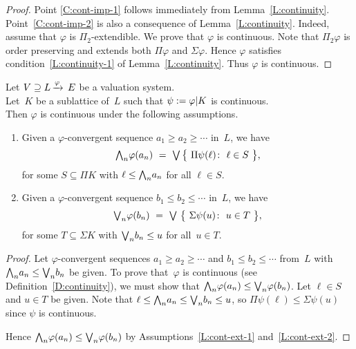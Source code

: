 \begin{proof}
Point \ref{C:cont-imp-1}
follows immediately from Lemma~\ref{L:continuity}.
Point~\ref{C:cont-imp-2} is also
a consequence of Lemma~\ref{L:continuity}.
Indeed, 
assume that $\varphi$ is $\Pi_2$-extendible.
We prove that $\varphi$ is continuous.
Note that $\Pi_2 \varphi$
is order preserving and
extends both $\Pi\varphi$ and $\Sigma\varphi$.
Hence $\varphi$ satisfies condition~\ref{L:continuity-1}
of Lemma~\ref{L:continuity}.
Thus $\varphi$ is continuous.
\end{proof}
%
%
\begin{lem}
\label{L:cont-ext}
Let $V \supseteq L\,\smash{\xrightarrow{\varphi}\,E}$
be a valuation system.\\
Let~$K$ be a sublattice of~$L$
such that $\psi := \varphi | K$
is continuous.\\
Then $\varphi$ is continuous
under the following assumptions.
\begin{enumerate}
\item\label{L:cont-ext-1}
Given a $\varphi$-convergent sequence $a_1 \geq a_2 \geq \dotsb$ 
in~$L$, we have
\begin{equation*}
\bw_n \varphi(a_n) \ = \ 
\bv\,\bigl\{\ \Pi \psi(\ell) \colon\ 
 \ell \in S \ \bigr\},
\end{equation*}
for some $S\subseteq \Pi K$
with $\ell \leq \textstyle{\bigwedge}_n a_n$ for all $\ell \in S$.

\item\label{L:cont-ext-2}
Given a 
$\varphi$-convergent sequence 
$b_1 \leq b_2 \leq \dotsb$ in~$L$,
we have
\begin{equation*}
\textstyle{\bigvee}_n \varphi(b_n) \ = 
\ \textstyle{\bigvee} \ \bigl\{ \ \Sigma\psi(u) \colon \ u \in T\ \bigr\},
\end{equation*}
for some $T\subseteq \Sigma K$ with $\textstyle{\bigvee}_n b_n \leq u$
for all~$u\in T$.
\end{enumerate}
\end{lem}
\begin{proof}
Let $\varphi$-convergent sequences $a_1 \geq a_2 \geq \dotsb$
and $b_1 \leq b_2 \leq \dotsb$ from~$L$ 
with $\textstyle{\bigwedge}_n a_n \leq \textstyle{\bigvee}_n b_n$ be given.
To prove that~$\varphi$
is continuous
(see Definition~\ref{D:continuity}),
we must show that $\textstyle{\bigwedge}_n \varphi(a_n) \leq \textstyle{\bigvee}_n \varphi(b_n)$.
Let $\ell\in S$ and $u\in T$
be given.
Note that 
$\ell \leq \textstyle{\bigwedge}_n a_n \leq \textstyle{\bigvee}_n b_n \leq u$,
so
$\Pi\psi(\ell) \leq \Sigma\psi (u)$
since $\psi$ is continuous.

Hence $\textstyle{\bigwedge}_n \varphi(a_n) \leq \textstyle{\bigvee}_n \varphi(b_n)$
by Assumptions~\ref{L:cont-ext-1}
and~\ref{L:cont-ext-2}.
\end{proof}
%
%

